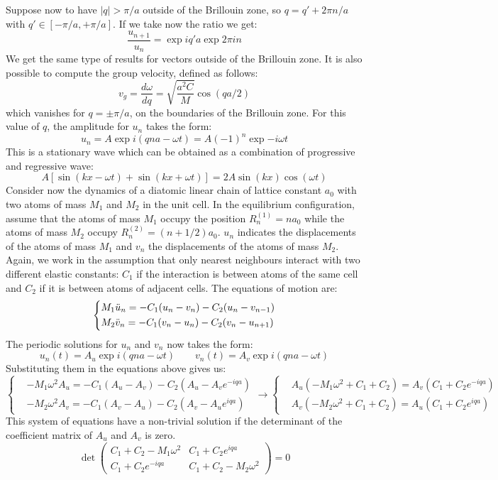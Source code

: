 \documentclass[10.75pt,a4paper,openright,bottom=2cm]{article}
\begin{document}
Suppose now to have $|q|>\pi/a$ outside of the  Brillouin zone, so $q=q'+2\pi n/a$ with $q'\in[-\pi/a,+\pi/a]$. If we take now the ratio we get:
\[
\frac{u_{n+1}}{u_n}=\exp{iq'a}\exp{2\pi in}
\]
We get the same type of results for vectors outside of the  Brillouin zone. It is also possible to compute the group velocity, defined as follows:
\[
v_g=\frac{d\omega}{dq}=\sqrt{\frac{a^2C}{M}}\cos(qa/2)
\]
which vanishes for $q=\pm\pi/a$, on the boundaries of the  Brillouin zone. For this value of $q$, the amplitude for $u_n$ takes the form:
\[
u_n=A\exp{i(qna-\omega t)}=A(-1)^n\exp{-i\omega t}
\]
This is a stationary wave which can be obtained as a combination of progressive and regressive wave:
\[
A[\sin(kx-\omega t)+\sin(kx+\omega t)]=2A\sin(kx)\cos(\omega t)
\]
Consider now the dynamics of a diatomic linear chain of lattice constant $a_0$ with two atoms of mass $M_1$ and $M_2$ in the unit cell. In the equilibrium configuration, assume that the atoms of mass $M_1$ occupy the position $R_n^{(1)}=na_0$ while the atoms of mass $M_2$ occupy $R_n^{(2)}=(n+1/2)a_0$. $u_n$ indicates the displacements of the atoms of mass $M_1$ and $v_n$ the displacements of the atoms of mass $M_2$. Again, we work in the assumption that only nearest neighbours interact with two different elastic constants: $C_1$ if the interaction is between atoms of the same cell and $C_2$ if it is between atoms of adjacent cells. The equations of motion are:
\[
\left\{
\begin{aligned}
&M_1\Ddot{u}_n=-C_1(u_n-v_n)-C_2(u_n-v_{n-1})\\
&M_2\Ddot{v}_n=-C_1(v_n-u_n)-C_2(v_n-u_{n+1})
\end{aligned}
\right.
\]
The periodic solutions for $u_n$ and $v_n$ now takes the form:
\[
u_n(t)=A_u\exp{i(qna-\omega t)} \qquad v_n(t)=A_v\exp{i(qna-\omega t)}
\]
Substituting them in the equations above gives us:
\[
\left\{
\begin{aligned}
&-M_1\omega^2A_u=-C_1(A_u-A_v)-C_2(A_u-A_ve^{-iqa})\\
&-M_2\omega^2A_v=-C_1(A_v-A_u)-C_2(A_v-A_ue^{iqa})
\end{aligned}
\right.
\to
\left\{
\begin{aligned}
&A_u(-M_1\omega^2+C_1+C_2)=A_v(C_1+C_2e^{-iqa})\\
&A_v(-M_2\omega^2+C_1+C_2)=A_u(C_1+C_2e^{iqa})
\end{aligned}
\right.
\]
This system of equations have a non-trivial solution if the determinant of the coefficient matrix of $A_u$ and $A_v$ is zero.
\[
\det\left(\begin{array}{cc}
    C_1+C_2-M_1\omega^2 & C_1+C_2e^{iqa} \\
    C_1+C_2e^{-iqa} & C_1+C_2-M_2\omega^2
\end{array}\right)=0
\]
\end{document}
